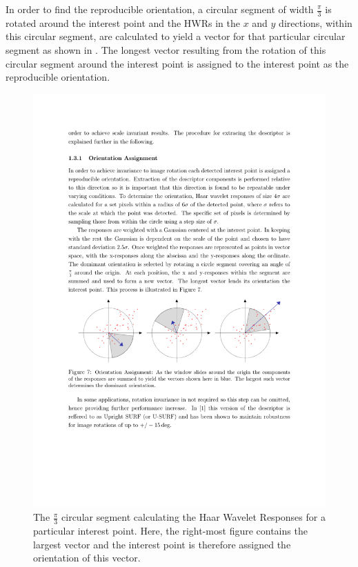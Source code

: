 \documentclass{report}
\begin{document}
In order to find the reproducible orientation, a circular segment of width $\frac{\pi}{3}$ is rotated around the interest point and the HWRs in the $x$ and $y$ directions, within this circular segment, are calculated to yield a vector for that particular circular segment as shown in  \cite{Evans2009}. The longest vector resulting from the rotation of this circular segment around the interest point is assigned to the interest point as the reproducible orientation.\\

\begin{figure}[h!] 
  \centering
    \includegraphics[width=1.0\textwidth]{../Drawings/methods/SURF2D_orientation_assignment.pdf}
    \caption{The $\frac{\pi}{3}$ circular segment calculating the Haar Wavelet Responses for a particular interest point. Here, the right-most figure contains the largest vector and the interest point is therefore assigned the orientation of this vector.}
    \label{fig:circularSegment}
\end{figure}
\end{document}
